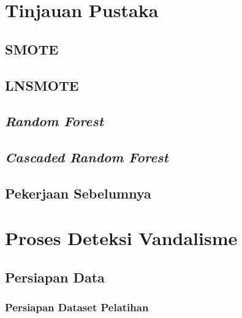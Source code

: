 \documentclass[12pt,a4paper,titlepage]{report}
\begin{document}
\chapter{Tinjauan Pustaka}

\section{SMOTE}

\newpage

\newpage

\section{LNSMOTE}

\newpage


\section{\textit{Random Forest}}



\section{\textit{Cascaded Random Forest}}



\newpage
\section{Pekerjaan Sebelumnya}


\chapter{Proses Deteksi Vandalisme}
\label{chapter:proses}



\section{Persiapan Data}
\label{persiapan_data}


\subsection{Persiapan Dataset Pelatihan}

\end{document}
